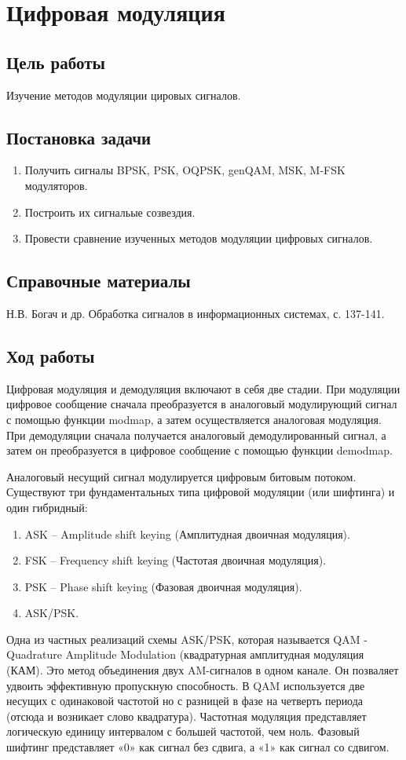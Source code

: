 \documentclass[10pt,a4paper]{article}
\begin{document}
\newpage
\section{Цифровая модуляция}

\subsection{Цель работы}
Изучение методов модуляции цировых сигналов.

\subsection{Постановка задачи}
	\begin{enumerate}
		\item Получить сигналы BPSK, PSK, OQPSK, genQAM, MSK, M-FSK модуляторов.
		\item Построить их сигнальые созвездия.
		\item Провести сравнение изученных методов модуляции цифровых сигналов.
	\end{enumerate}

\subsection{Справочные материалы}
Н.В. Богач и др. Обработка сигналов в информационных системах, с. 137-141.

\subsection{Ход работы}
Цифровая модуляция и демодуляция включают в себя две стадии. При модуляции цифровое сообщение сначала преобразуется в аналоговый модулирующий сигнал с помощью функции modmap, а затем осуществляется аналоговая модуляция. При демодуляции сначала получается аналоговый демодулированный сигнал, а затем он преобразуется в цифровое сообщение с помощью функции demodmap.

Аналоговый несущий сигнал модулируется цифровым битовым потоком.
Существуют три фундаментальных типа цифровой модуляции (или шифтинга) и один гибридный:
\begin{enumerate}
    \item ASK – Amplitude shift keying (Амплитудная двоичная модуляция).
    \item FSK – Frequency shift keying (Частотая двоичная модуляция).
    \item PSK – Phase shift keying (Фазовая двоичная модуляция).
    \item ASK/PSK.
\end{enumerate}
Одна из частных реализаций схемы ASK/PSK, которая называется QAM - Quadrature Amplitude Modulation (квадратурная амплитудная модуляция (КАМ). Это метод объединения двух AM-сигналов в одном канале. Он позваляет удвоить эффективную пропускную способность. В QAM используется две несущих с одинаковой частотой но с разницей в фазе на четверть периода (отсюда и возникает слово квадратура). 
Частотная модуляция представляет логическую единицу интервалом с большей частотой, чем ноль.
Фазовый шифтинг представляет «0» как сигнал без сдвига, а «1» как сигнал со сдвигом.
\end{document}
